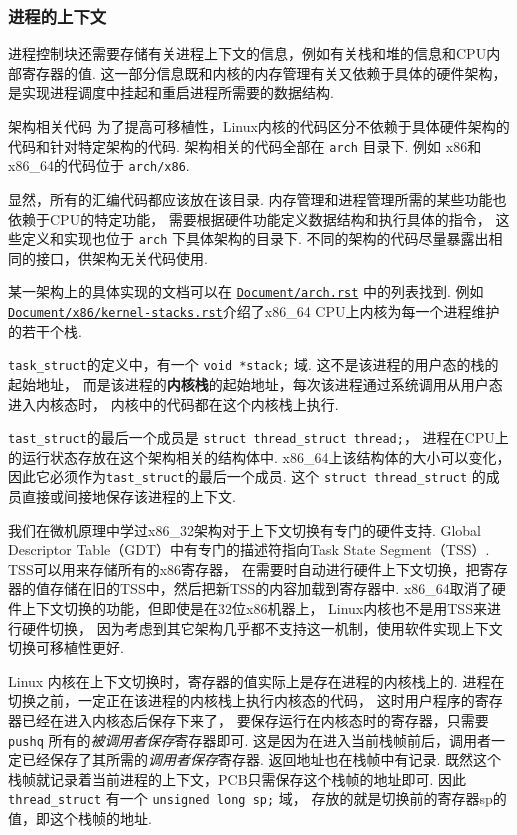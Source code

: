 \subsubsection{进程的上下文}
进程控制块还需要存储有关进程上下文的信息，例如有关栈和堆的信息和CPU内部寄存器的值.
这一部分信息既和内核的内存管理有关又依赖于具体的硬件架构，
是实现进程调度中挂起和重启进程所需要的数据结构.
\begin{readsrcbox}{架构相关代码}
	为了提高可移植性，Linux内核的代码区分不依赖于具体硬件架构的代码和针对特定架构的代码.
	架构相关的代码全部在 \lstinline{arch} 目录下.
	例如 x86和x86\_64的代码位于 \lstinline{arch/x86}.

	显然，所有的汇编代码都应该放在该目录.
	内存管理和进程管理所需的某些功能也依赖于CPU的特定功能，
	需要根据硬件功能定义数据结构和执行具体的指令，
	这些定义和实现也位于 \lstinline{arch} 下具体架构的目录下.
	不同的架构的代码尽量暴露出相同的接口，供架构无关代码使用.

	某一架构上的具体实现的文档可以在 \href{https://docs.kernel.org/arch.html}{\lstinline{Document/arch.rst}} 中的列表找到.
	例如\href{https://docs.kernel.org/x86/kernel-stacks.html}{\lstinline{Document/x86/kernel-stacks.rst}}介绍了x86\_64 CPU上内核为每一个进程维护的若干个栈.
\end{readsrcbox}
\lstinline{task_struct}的定义中，有一个 \lstinline{void *stack;} 域.
这不是该进程的用户态的栈的起始地址，
而是该进程的\textbf{内核栈}的起始地址，每次该进程通过系统调用从用户态进入内核态时，
内核中的代码都在这个内核栈上执行.

\lstinline{tast_struct}的最后一个成员是 \lstinline{struct thread_struct thread;}，
进程在CPU上的运行状态存放在这个架构相关的结构体中.
x86\_64上该结构体的大小可以变化，因此它必须作为\lstinline{tast_struct}的最后一个成员.
这个 \lstinline{struct thread_struct} 的成员直接或间接地保存该进程的上下文.

我们在微机原理中学过x86\_32架构对于上下文切换有专门的硬件支持.
Global Descriptor Table（GDT）中有专门的描述符指向Task State Segment（TSS）.
TSS可以用来存储所有的x86寄存器，
在需要时自动进行硬件上下文切换，把寄存器的值存储在旧的TSS中，然后把新TSS的内容加载到寄存器中.
x86\_64取消了硬件上下文切换的功能，但即使是在32位x86机器上，
Linux内核也不是用TSS来进行硬件切换，
因为考虑到其它架构几乎都不支持这一机制，使用软件实现上下文切换可移植性更好.

Linux 内核在上下文切换时，寄存器的值实际上是存在进程的内核栈上的.
进程在切换之前，一定正在该进程的内核栈上执行内核态的代码，
这时用户程序的寄存器已经在进入内核态后保存下来了，
要保存运行在内核态时的寄存器，只需要 \lstinline{pushq} 所有的\textit{被调用者保存}寄存器即可.
这是因为在进入当前栈帧前后，调用者一定已经保存了其所需的\textit{调用者保存}寄存器.
返回地址也在栈帧中有记录.
既然这个栈帧就记录着当前进程的上下文，PCB只需保存这个栈帧的地址即可.
因此 \lstinline{thread_struct} 有一个 \lstinline{unsigned long sp;} 域，
存放的就是切换前的寄存器sp的值，即这个栈帧的地址.


